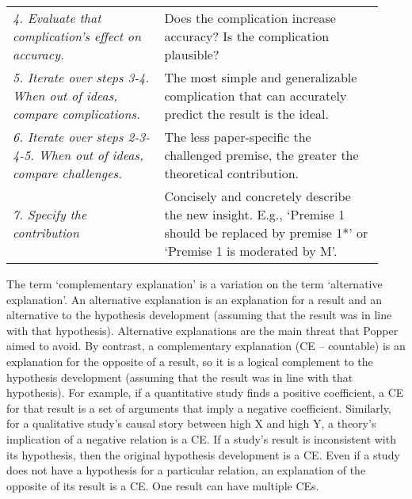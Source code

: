 \documentclass[authordate, meta]{jote-new-article}
\begin{document}
\begin{table}[t!]
\begin{fullwidth}
\begin{tabularx}{\columnwidth}{@{}>{\RaggedRight\arraybackslash}p{0.38\linewidth} >{\RaggedRight\arraybackslash}p{0.55\linewidth}@{}}
      \emph{4. Evaluate that complication's effect on accuracy.}                   & Does the complication increase accuracy? Is the complication plausible?                                                                                                                                                                                                                           \\
      \emph{5. Iterate over steps 3-4. When out of ideas, compare complications.}  & The most  simple and generalizable  complication that can  accurately  predict the result is the ideal.                                                                                                                                                                                           \\
      \emph{6. Iterate over steps 2-3-4-5. When out of ideas, compare challenges.} & The  less paper-specific the challenged premise, the greater the theoretical contribution.                                                                                                                                                                                                        \\
      \emph{7. Specify the contribution}                                           & Concisely and concretely describe the new insight.  \newline E.g., ‘Premise 1 should be replaced by premise 1*' or ‘Premise 1 is moderated by M'.                                                                                                                                                 \\
    \end{tabularx}
  \end{fullwidth}
\end{table}
The term ‘complementary explanation' is a variation on the term ‘alternative explanation'. An alternative explanation is an explanation for a result and an alternative to the hypothesis development (assuming that the result was in line with that hypothesis). Alternative explanations are the main threat that Popper aimed to avoid. By contrast, a complementary explanation (CE -- countable) is an explanation for the opposite of a result, so it is a logical complement to the hypothesis development (assuming that the result was in line with that hypothesis). For example, if a quantitative study finds a positive coefficient, a CE for that result is a set of arguments that imply a negative coefficient. Similarly, for a qualitative study's causal story between high X and high Y, a theory's implication of a negative relation is a CE. If a study's result is inconsistent with its hypothesis, then the original hypothesis development is a CE. Even if a study does not have a hypothesis for a particular relation, an explanation of the opposite of its result is a CE. One result can have multiple CEs.
\end{document}
